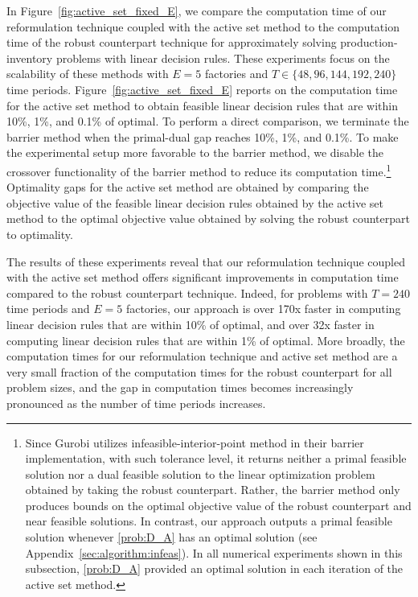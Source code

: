 \documentclass[nonblindrev,mnsc]{informs3} %
\begin{document}
In Figure~\ref{fig:active_set_fixed_E}, we compare the computation time of our  reformulation technique coupled with the active set method to the  computation time of the robust counterpart technique for approximately solving production-inventory problems with linear decision rules.  These experiments focus on the scalability of these methods with $E=5$ factories and $T \in \{48,96,144,192,240 \}$ time periods. Figure~\ref{fig:active_set_fixed_E} reports on the computation time for the active set method to obtain feasible linear decision rules that are within 10\%, 1\%, and 0.1\% of optimal. To perform a direct comparison, we terminate the barrier method when the primal-dual gap reaches 10\%, 1\%, and 0.1\%. To make the experimental setup more favorable to the barrier method, we  disable the crossover functionality of the barrier method to reduce its computation time.\footnote{Since Gurobi utilizes infeasible-interior-point method in their barrier implementation, with such tolerance level, it returns neither a primal feasible solution nor a dual feasible solution to the linear optimization problem obtained by taking the robust counterpart. Rather, the barrier method only produces bounds on the optimal objective value of the robust counterpart and near feasible solutions. In contrast, our approach outputs a primal feasible solution whenever \eqref{prob:D_A} has an optimal solution (see Appendix~\ref{sec:algorithm:infeas}). In all numerical experiments shown in this subsection, \eqref{prob:D_A} provided an optimal solution in each iteration of the active set method. }  Optimality gaps for the active set method are obtained by comparing the objective value of the  feasible linear decision rules obtained by the active set method to the optimal objective value obtained by solving the robust counterpart to optimality.



The results of these experiments reveal that our reformulation technique coupled with the active set method offers significant improvements in computation time compared to the robust counterpart technique. Indeed, for problems with $T = 240$ time periods and $E = 5$ factories, our approach is over 170x faster  in computing linear decision rules that are within 10\% of optimal, and over 32x faster in computing linear decision rules that are within 1\% of optimal. %
More broadly, the computation times for our  reformulation technique and active set method are a very small fraction of the  computation times for the  robust counterpart for all problem sizes, and the gap in computation times becomes increasingly pronounced as the number of time periods increases. %
\end{document}
